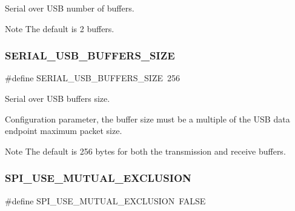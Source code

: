Serial over U\+SB number of buffers. 

\begin{DoxyNote}{Note}
The default is 2 buffers. 
\end{DoxyNote}
\hypertarget{group__HAL__CONF_ga24727a5407c6a41af53b59588592da80}{}\label{group__HAL__CONF_ga24727a5407c6a41af53b59588592da80} 
\subsubsection{\texorpdfstring{S\+E\+R\+I\+A\+L\+\_\+\+U\+S\+B\+\_\+\+B\+U\+F\+F\+E\+R\+S\+\_\+\+S\+I\+ZE}{SERIAL\_USB\_BUFFERS\_SIZE}}
{\footnotesize\ttfamily \#define S\+E\+R\+I\+A\+L\+\_\+\+U\+S\+B\+\_\+\+B\+U\+F\+F\+E\+R\+S\+\_\+\+S\+I\+ZE~256}



Serial over U\+SB buffers size. 

Configuration parameter, the buffer size must be a multiple of the U\+SB data endpoint maximum packet size. \begin{DoxyNote}{Note}
The default is 256 bytes for both the transmission and receive buffers. 
\end{DoxyNote}
\hypertarget{group__HAL__CONF_ga36d1818f9631f955f7cc94629b1d5498}{}\label{group__HAL__CONF_ga36d1818f9631f955f7cc94629b1d5498} 
\subsubsection{\texorpdfstring{S\+P\+I\+\_\+\+U\+S\+E\+\_\+\+M\+U\+T\+U\+A\+L\+\_\+\+E\+X\+C\+L\+U\+S\+I\+ON}{SPI\_USE\_MUTUAL\_EXCLUSION}}
{\footnotesize\ttfamily \#define S\+P\+I\+\_\+\+U\+S\+E\+\_\+\+M\+U\+T\+U\+A\+L\+\_\+\+E\+X\+C\+L\+U\+S\+I\+ON~F\+A\+L\+SE}



